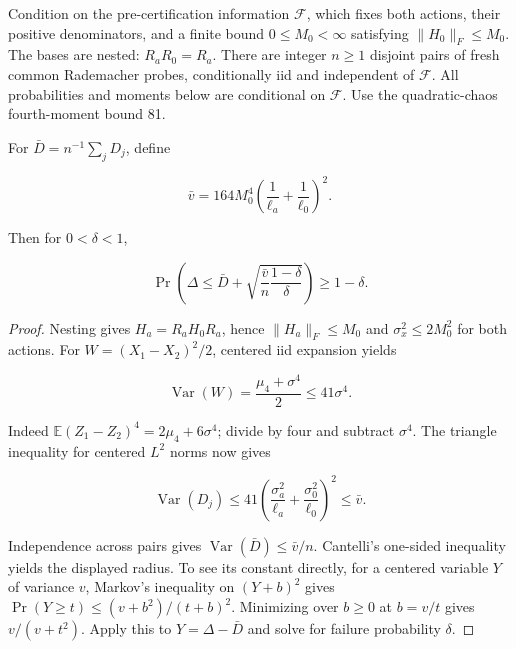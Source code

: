 \begin{theorem}\label{thm:T13}
Condition on the pre-certification information $\mathcal F$, which fixes both actions, their positive denominators, and a finite bound $0\le M_0<\infty$ satisfying $\|H_0\|_F\le M_0$. The bases are nested: $R_aR_0=R_a$. There are integer $n\ge1$ disjoint pairs of fresh common Rademacher probes, conditionally iid and independent of $\mathcal F$. All probabilities and moments below are conditional on $\mathcal F$. Use the quadratic-chaos fourth-moment bound 81.


For $\bar D=n^{-1}\sum_jD_j$, define


\begin{equation}
\bar v=164M_0^4\left(\frac1{\ell_a}+\frac1{\ell_0}\right)^2.
\end{equation}


Then for $0<\delta<1$,


\begin{equation}
\Pr\left(\Delta\le\bar D+
\sqrt{\frac{\bar v}{n}\frac{1-\delta}{\delta}}\right)\ge1-\delta.
\end{equation}


\end{theorem}
\begin{proof}
Nesting gives $H_a=R_aH_0R_a$, hence $\|H_a\|_F\le M_0$ and $\sigma_x^2\le2M_0^2$ for both actions. For $W=(X_1-X_2)^2/2$, centered iid expansion yields


\begin{equation}
\operatorname{Var}(W)=\frac{\mu_4+\sigma^4}{2}\le41\sigma^4.
\end{equation}


Indeed $\mathbb E(Z_1-Z_2)^4=2\mu_4+6\sigma^4$; divide by four and subtract $\sigma^4$. The triangle inequality for centered $L^2$ norms now gives


\begin{equation}
\operatorname{Var}(D_j)\le41
\left(\frac{\sigma_a^2}{\ell_a}+\frac{\sigma_0^2}{\ell_0}\right)^2\le\bar v.
\end{equation}


Independence across pairs gives $\operatorname{Var}(\bar D)\le\bar v/n$. Cantelli's one-sided inequality yields the displayed radius. To see its constant directly, for a centered variable $Y$ of variance $v$, Markov's inequality on $(Y+b)^2$ gives $\Pr(Y\ge t)\le(v+b^2)/(t+b)^2$. Minimizing over $b\ge0$ at $b=v/t$ gives $v/(v+t^2)$. Apply this to $Y=\Delta-\bar D$ and solve for failure probability $\delta$.

\end{proof}


